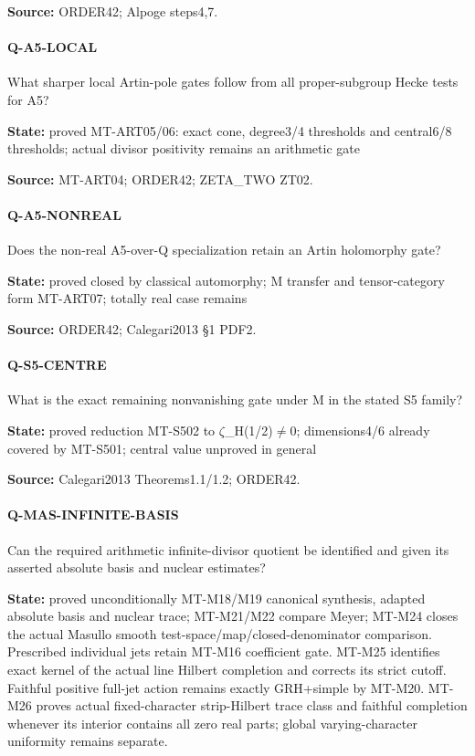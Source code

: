 \documentclass[11pt,a4paper]{article}
\begin{document}
\textbf{Source:} ORDER42; Alpoge steps4,7.

\paragraph{Q-A5-LOCAL} What sharper local Artin-pole gates follow from all proper-subgroup Hecke tests for A5?

\textbf{State:} proved MT-ART05/\allowbreak{}06:\allowbreak{} exact cone, degree3/\allowbreak{}4 thresholds and central6/\allowbreak{}8 thresholds; actual divisor positivity remains an arithmetic gate

\textbf{Source:} MT-ART04; ORDER42; ZETA\_\allowbreak{}TWO ZT02.

\paragraph{Q-A5-NONREAL} Does the non-real A5-over-Q specialization retain an Artin holomorphy gate?

\textbf{State:} proved closed by classical automorphy; M transfer and tensor-category form MT-ART07; totally real case remains

\textbf{Source:} ORDER42; Calegari2013 §1 PDF2.

\paragraph{Q-S5-CENTRE} What is the exact remaining nonvanishing gate under M in the stated S5 family?

\textbf{State:} proved reduction MT-S502 to \ensuremath{\zeta}\_\allowbreak{}H(1/\allowbreak{}2)\ensuremath{\ne}0; dimensions4/\allowbreak{}6 already covered by MT-S501; central value unproved in general

\textbf{Source:} Calegari2013 Theorems1.\allowbreak{}1/\allowbreak{}1.\allowbreak{}2; ORDER42.

\paragraph{Q-MAS-INFINITE-BASIS} Can the required arithmetic infinite-divisor quotient be identified and given its asserted absolute basis and nuclear estimates?

\textbf{State:} proved unconditionally MT-M18/\allowbreak{}M19 canonical synthesis, adapted absolute basis and nuclear trace; MT-M21/\allowbreak{}M22 compare Meyer; MT-M24 closes the actual Masullo smooth test-space/\allowbreak{}map/\allowbreak{}closed-denominator comparison.\allowbreak{} Prescribed individual jets retain MT-M16 coefficient gate.\allowbreak{} MT-M25 identifies exact kernel of the actual line Hilbert completion and corrects its strict cutoff.\allowbreak{} Faithful positive full-jet action remains exactly GRH+simple by MT-M20.\allowbreak{} MT-M26 proves actual fixed-character strip-Hilbert trace class and faithful completion whenever its interior contains all zero real parts; global varying-character uniformity remains separate.\allowbreak{}
\end{document}

